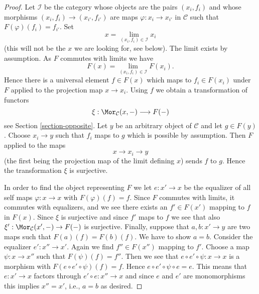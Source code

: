 \begin{proof}
Let $\mathcal{I}$ be the category whose objects are the pairs $(x_i, f_i)$
and whose morphisms $(x_i, f_i) \to (x_{i'}, f_{i'})$ are maps
$\varphi : x_i \to x_{i'}$ in $\mathcal{C}$
such that $F(\varphi)(f_i) = f_{i'}$. Set
$$
x = \lim_{(x_i, f_i) \in \mathcal{I}} x_i
$$
(this will not be the $x$ we are looking for, see below).
The limit exists by assumption. As $F$ commutes with limits
we have
$$
F(x) = \lim_{(x_i, f_i) \in \mathcal{I}} F(x_i).
$$
Hence there is a universal element $f \in F(x)$ which maps to $f_i \in F(x_i)$
under $F$ applied to the projection map $x \to x_i$.
Using $f$ we obtain a transformation of functors
$$
\xi : \Mor_\mathcal{C}(x, - ) \longrightarrow F(-)
$$
see Section \ref{section-opposite}. Let $y$ be an arbitrary object of
$\mathcal{C}$ and let $g \in F(y)$. Choose $x_i \to y$ such that $f_i$
maps to $g$ which is possible by assumption. Then $F$ applied to the maps
$$
x \longrightarrow x_i \longrightarrow y
$$
(the first being the projection map of the limit defining $x$)
sends $f$ to $g$. Hence the transformation $\xi$ is surjective.

\medskip\noindent
In order to find the object representing $F$ we let $e : x' \to x$ be the
equalizer of all self maps $\varphi : x \to x$ with $F(\varphi)(f) = f$.
Since $F$ commutes with limits, it commutes with equalizers, and
we see there exists an $f' \in F(x')$ mapping to $f$ in $F(x)$.
Since $\xi$ is surjective and since $f'$ maps to $f$ we see that
also $\xi' : \Mor_\mathcal{C}(x', -) \to F(-)$ is surjective.
Finally, suppose that $a, b : x' \to y$ are two maps such that
$F(a)(f) = F(b)(f)$. We have to show $a = b$. Consider the equalizer
$e' : x'' \to x'$. Again we find $f'' \in F(x'')$ mapping to $f'$.
Choose a map $\psi : x \to x''$ such that $F(\psi)(f) = f''$.
Then we see that $e \circ e' \circ \psi : x \to x$ is a morphism
with $F(e \circ e' \circ \psi)(f) = f$. Hence
$e \circ e' \circ \psi \circ e = e$. This means that $e : x' \to x$
factors through $e' \circ e : x'' \to x$ and since $e$ and $e'$
are monomorphisms this implies $x'' = x'$, i.e., $a = b$ as desired.
\end{proof}

